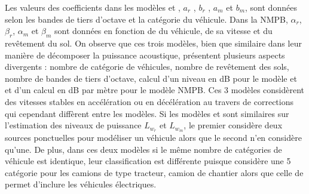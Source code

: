 Les valeurs des coefficients dans les modèles  et , $a_r$ ,  $b_r$ ,  $a_m$  et $b_m$,   sont données selon les bandes de tiers d'octave et la catégorie du véhicule. Dans la NMPB, $\alpha_r$, $\beta_r$, $\alpha_m$ et $\beta_m$ sont données en fonction de du véhicule, de sa vitesse et du revêtement du sol.
On observe que ces trois modèles, bien que similaire dans leur manière de décomposer la puissance acoustique, présentent plusieurs aspects divergents : nombre de catégorie de véhicules, nombre de revêtement des sols, nombre de bandes de tiers d'octave, calcul d'un niveau en dB pour le modèle  et  et d'un calcul en dB par mètre pour le modèle NMPB. Ces 3 modèles considèrent des vitesses stables en accélération ou en décélération au travers de corrections qui cependant diffèrent entre les modèles. Si les modèles  et  sont similaires sur l'estimation des niveaux de puissance $L_{w_r}$ et $L_{w_m}$, le premier considère deux sources ponctuelles pour modéliser un véhicule alors que le second n'en considère qu'une. De plus, dans ces deux modèles si le même nombre de catégories de véhicule est identique, leur classification est différente puisque  considère une 5\ieme{} catégorie pour les camions de type tracteur, camion de chantier alors que celle de  permet d'inclure les véhicules électriques.

